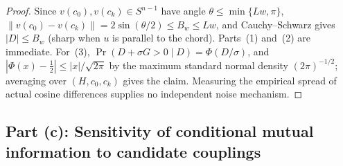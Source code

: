 \documentclass[11pt]{article}
\theoremstyle{plain}
\theoremstyle{definition}
\theoremstyle{remark}
\begin{document}
\begin{proof}
Since $v(c_0), v(c_k) \in S^{n-1}$ have angle $\theta \le \min\{Lw, \pi\}$, $\|v(c_0) - v(c_k)\| = 2\sin(\theta/2) \le B_w \le Lw$, and Cauchy--Schwarz gives $|D| \le B_w$ (sharp when $u$ is parallel to the chord). Parts~(1) and~(2) are immediate. For~(3), $\Pr(D + \sigma G > 0 \mid D) = \Phi(D/\sigma)$, and $|\Phi(x) - \frac{1}{2}| \le |x|/\sqrt{2\pi}$ by the maximum standard normal density $(2\pi)^{-1/2}$; averaging over $(H, c_0, c_k)$ gives the claim. Measuring the empirical spread of actual cosine differences supplies no independent noise mechanism.
\end{proof}

\subsection{Part (c): Sensitivity of conditional mutual information to candidate couplings}
\end{document}
